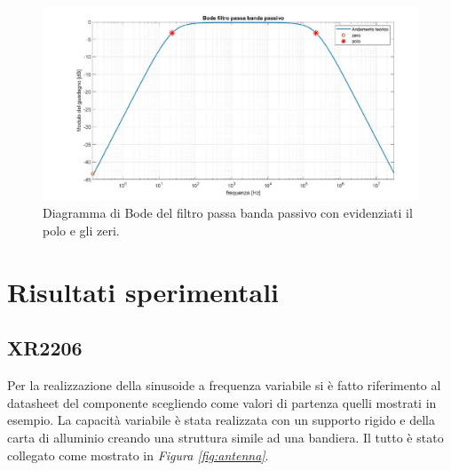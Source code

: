 \documentclass[titlepage]{report}
\begin{document}
\begin{figure}[H]
	\centering
	\includegraphics[scale=0.8]{Immagini/bode_filtro_passa_banda_matlab.pdf}
	\caption{Diagramma di Bode del filtro passa banda passivo con evidenziati il polo e gli zeri.}
	\label{fig:BodeBP}
\end{figure}
	
\chapter{Risultati sperimentali}
\label{ch:Risultati_sperimentali}
\section{XR2206}
	Per la realizzazione della sinusoide a frequenza variabile si è fatto riferimento al datasheet del componente scegliendo come valori di partenza quelli mostrati in esempio. 
	La capacità variabile è stata realizzata con un supporto rigido e della carta di alluminio creando una struttura simile ad una bandiera. Il tutto è stato collegato come mostrato in \textit{Figura \ref{fig:antenna}}.
\end{document}
